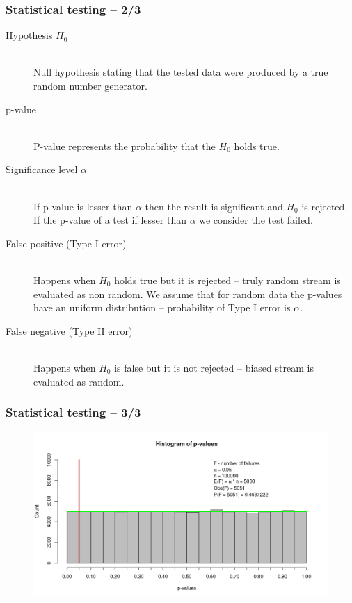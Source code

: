 \documentclass[aspectratio=169]{beamer}
\begin{document}
\begin{frame}
\frametitle{Statistical testing -- 2/3}

\begin{description}
\item[Hypothesis $H_0$] \hfill \\
Null hypothesis stating that the tested data were produced by a true random number generator.
\item[p-value] \hfill \\
P-value represents the probability that the $H_0$ holds true.
\item[Significance level $\alpha$] \hfill \\
If p-value is lesser than $\alpha$ then the result is significant and $H_0$ is rejected. If the p-value of a test if lesser than $\alpha$ we consider the test failed.
\item[False positive (Type I error)] \hfill \\
Happens when $H_0$ holds true but it is rejected -- truly random stream is evaluated as non random. We assume that for random data the p-values have an uniform distribution -- probability of Type I error is $\alpha$.
\item[False negative (Type II error)] \hfill \\
Happens when $H_0$ is false but it is not rejected -- biased stream is evaluated as random.
\end{description}

\end{frame}

\begin{frame}
\frametitle{Statistical testing -- 3/3}

\begin{figure}
\begin{nomar}
\centering
\includegraphics[width=.8\paperwidth]{figures/single-fails-4.png} 
\end{nomar}
\end{figure}

\end{frame}
\end{document}
